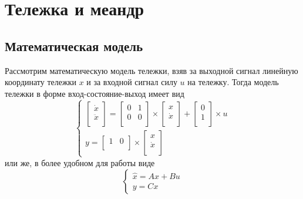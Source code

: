 \section{Тележка и меандр} 
\subsection{Математическая модель}
Рассмотрим математическую модель тележки, взяв за выходной сигнал линейную 
координату тележки $x$ и за входной сигнал силу $u$ на тележку. 
Тогда модель тележки в форме вход-состояние-выход имеет вид
\begin{equation}
    \begin{cases}
        \begin{bmatrix}
            \dot{x} \\ 
            \ddot{x} \\
        \end{bmatrix} = 
        \begin{bmatrix}
            0 & 1 \\ 
            0 & 0 \\
        \end{bmatrix} \times \begin{bmatrix}
            x \\ 
            \dot{x} \\
        \end{bmatrix} + \begin{bmatrix}
            0 \\ 
            1 \\
        \end{bmatrix} \times u  \\
        y = \begin{bmatrix}
            1 & 0 \\
        \end{bmatrix} \times \begin{bmatrix}
            x \\ 
            \dot{x} \\
        \end{bmatrix}
    \end{cases}
\end{equation}
или же, в более удобном для работы виде
\begin{equation}
    \begin{cases}
        \hat{x} = Ax + Bu \\ 
        y = Cx
    \end{cases}
\end{equation}
